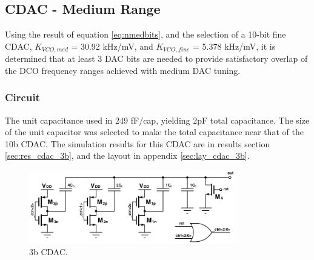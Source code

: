 	\FloatBarrier
	\subsection{CDAC - Medium Range}
	Using the result of equation \ref{eq:nmedbits}, and the selection of a 10-bit fine CDAC, $K_{VCO,med}$ = 30.92 kHz/mV, and $K_{VCO,fine}$ = 5.378 kHz/mV, it is determined that at least 3 DAC bits are needed to provide satisfactory overlap of the DCO frequency ranges achieved with medium DAC tuning.
		\subsubsection{Circuit}
		The unit capacitance used in 249 fF/cap, yielding 2pF total capacitance. The size of the unit capacitor was selected to make the total capacitance near that of the 10b CDAC. The simulation results for this CDAC are in results section \ref{sec:res_cdac_3b}, and the layout in appendix \ref{sec:lay_cdac_3b}.
			\begin{figure}[htb!]
			        \centering
			        \includegraphics[width=0.8\textwidth, angle=0]{./figs/design/cdac_3b}
			    \caption{3b CDAC.}
			    \label{fig:3b_cdac_cir}
			\end{figure}

